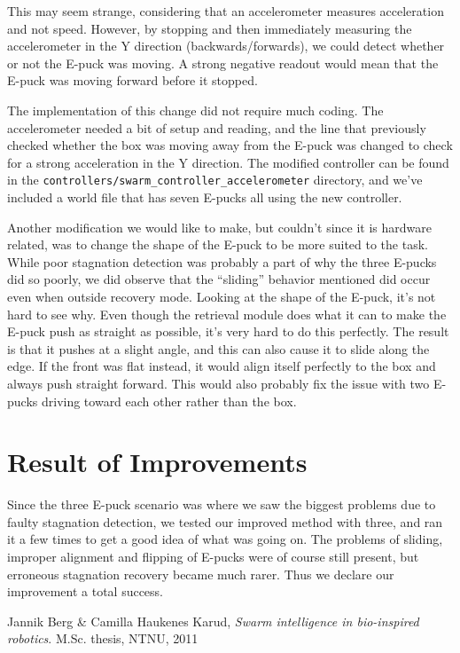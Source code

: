 \documentclass[a4paper,12pt]{article}
\begin{document}
This may seem strange, considering that an accelerometer measures acceleration and not speed. However, by stopping and then immediately measuring the accelerometer in the Y direction (backwards/forwards), we could detect whether or not the E-puck was moving. A strong negative readout would mean that the E-puck was moving forward before it stopped.

The implementation of this change did not require much coding. The accelerometer needed a bit of setup and reading, and the line that previously checked whether the box was moving away from the E-puck was changed to check for a strong acceleration in the Y direction. The modified controller can be found in the \texttt{controllers/swarm\_controller\_accelerometer} directory, and we've included a world file that has seven E-pucks all using the new controller.

Another modification we would like to make, but couldn't since it is hardware related, was to change the shape of the E-puck to be more suited to the task. While poor stagnation detection was probably a part of why the three E-pucks did so poorly, we did observe that the ``sliding'' behavior mentioned did occur even when outside recovery mode. Looking at the shape of the E-puck, it's not hard to see why. Even though the retrieval module does what it can to make the E-puck push as straight as possible, it's very hard to do this perfectly. The result is that it pushes at a slight angle, and this can also cause it to slide along the edge. If the front was flat instead, it would align itself perfectly to the box and always push straight forward. This would also probably fix the issue with two E-pucks driving toward each other rather than the box.

\section{Result of Improvements}
Since the three E-puck scenario was where we saw the biggest problems due to faulty stagnation detection, we tested our improved method with three, and ran it a few times to get a good idea of what was going on. The problems of sliding, improper alignment and flipping of E-pucks were of course still present, but erroneous stagnation recovery became much rarer. Thus we declare our improvement a total success.

\begin{thebibliography}{9}

  Jannik Berg \& Camilla Haukenes Karud,
  \emph{Swarm intelligence in bio-inspired robotics}.
  M.Sc. thesis,
  NTNU,
  2011

\end{thebibliography}
\end{document}
